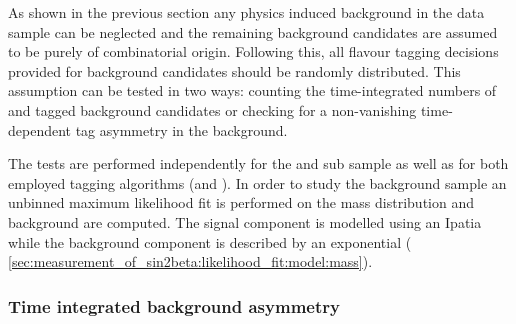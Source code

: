 As shown in the previous section any physics induced background in the data
sample can be neglected and the remaining background candidates are assumed to
be purely of combinatorial origin. Following this, all flavour tagging decisions
provided for background candidates should be randomly distributed. This
assumption can be tested in two ways: counting the time-integrated numbers of
\Bd and \Bdbar tagged background candidates or checking for a non-vanishing
time-dependent tag asymmetry in the background.

The tests are performed independently for the \catDD and \catLL sub sample as
well as for both employed tagging algorithms (\OS and \SSpi). In order to study
the background sample an unbinned maximum likelihood fit is performed on the \Bd
mass distribution and background \sWeights \cite{Pivk:2004ty} are computed. The
signal component is modelled using an Ipatia \PDF while the background component
is described by an exponential \PDF (\cf
\cref{sec:measurement_of_sin2beta:likelihood_fit:model:mass}).

\subsubsection{Time integrated background asymmetry}
\label{sec:measurement_of_sin2beta:physic_backgrounds:tagging_asymmetries:time_integrated}

